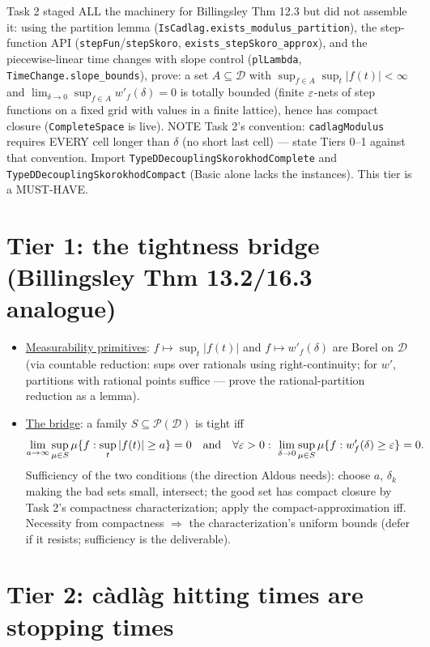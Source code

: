 \documentclass[11pt]{article}
\theoremstyle{plain}
\theoremstyle{remark}
\newcommand{\D}{\mathcal D}
\begin{document}
Task 2 staged ALL the machinery for Billingsley Thm 12.3 but did not assemble
it: using the partition lemma (\texttt{IsCadlag.exists\_modulus\_partition}),
the step-function API (\texttt{stepFun}/\texttt{stepSkoro},
\texttt{exists\_stepSkoro\_approx}), and the piecewise-linear time changes
with slope control (\texttt{plLambda}, \texttt{TimeChange.slope\_bounds}),
prove: a set $A\subseteq\D$ with $\sup_{f\in A}\sup_t|f(t)|<\infty$ and
$\lim_{\delta\to0}\sup_{f\in A}w'_f(\delta)=0$ is totally bounded (finite
$\varepsilon$-nets of step functions on a fixed grid with values in a finite
lattice), hence has compact closure (\texttt{CompleteSpace} is live). NOTE
Task 2's convention: \texttt{cadlagModulus} requires EVERY cell longer than
$\delta$ (no short last cell) --- state Tiers 0--1 against that convention.
Import \texttt{TypeDDecouplingSkorokhodComplete} and
\texttt{TypeDDecouplingSkorokhodCompact} (Basic alone lacks the instances).
This tier is a MUST-HAVE.

\section*{Tier 1: the tightness bridge (Billingsley Thm 13.2/16.3 analogue)}

\begin{itemize}
\item[(a)] \underline{Measurability primitives}: $f\mapsto\sup_t|f(t)|$ and
$f\mapsto w'_f(\delta)$ are Borel on $\D$ (via countable reduction: sups over
rationals using right-continuity; for $w'$, partitions with rational points
suffice --- prove the rational-partition reduction as a lemma).
\item[(b)] \underline{The bridge}: a family
$S\subseteq\mathcal P(\D)$ is tight iff
\[
  \lim_{a\to\infty}\sup_{\mu\in S}\mu\{f:\sup_t|f(t)|\ge a\}=0
  \quad\text{and}\quad
  \forall\varepsilon>0:\ \lim_{\delta\to0}\sup_{\mu\in S}
  \mu\{f: w'_f(\delta)\ge\varepsilon\}=0 .
\]
Sufficiency of the two conditions (the direction Aldous needs): choose $a$,
$\delta_k$ making the bad sets small, intersect; the good set has compact
closure by Task 2's compactness characterization; apply the
compact-approximation iff. Necessity from compactness $\Rightarrow$ the
characterization's uniform bounds (defer if it resists; sufficiency is the
deliverable).
\end{itemize}

\section*{Tier 2: c\`adl\`ag hitting times are stopping times}
\end{document}

